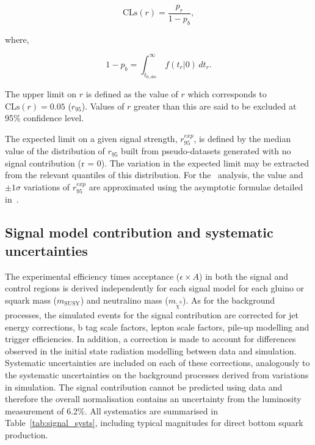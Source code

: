 \begin{equation}
\text{CLs}(r) = \frac{p_r}{1-p_b},
\end{equation}

\noindent where,

\begin{equation}
1-p_b = \int_{t_{0,obs}}^{\infty}\, f(t_r|0)\, dt_r.
\end{equation}

The upper limit on $r$ is defined as the value of $r$ which corresponds to 
$\text{CLs}(r) = 0.05$ ($r_{95}$). Values of $r$ greater than this are said to be excluded at 95\%
confidence level.

The expected limit on a given signal strength, $r_{95}^{exp}$, is defined by the median value of the distribution
of $r_{95}$ built from pseudo-datasets generated with no signal contribution (r = 0). The variation in the 
expected limit may be extracted from the relevant quantiles of this distribution.
For the \alphat~analysis, the value and $\pm 1\sigma$ variations of $r_{95}^{exp}$ are approximated using 
the asymptotic formulae detailed in~\cite{asymp}.

\subsection{Signal model contribution and systematic uncertainties}

The experimental efficiency times acceptance ($\epsilon \times A$) in both the signal and 
control regions is derived independently for each signal model for each gluino or squark 
mass ($m_{\text{SUSY}}$) and neutralino mass ($m_{\tilde{\chi}^{0}}$). As for the 
background processes, the simulated events for the signal contribution are corrected for 
jet energy corrections, b tag scale factors, lepton scale factors, pile-up modelling and trigger efficiencies.
In addition, a correction is made to account for differences observed in the initial 
state radiation modelling between data and simulation. Systematic uncertainties are included 
on each of these corrections, analogously to the systematic uncertainties on the background processes derived from
variations in simulation. The signal contribution cannot be predicted using data and therefore the overall normalisation contains an uncertainty
from the luminosity measurement of 6.2\%. All systematics are summarised
in Table~\ref{tab:signal_systs}, including typical magnitudes for direct bottom squark production.

